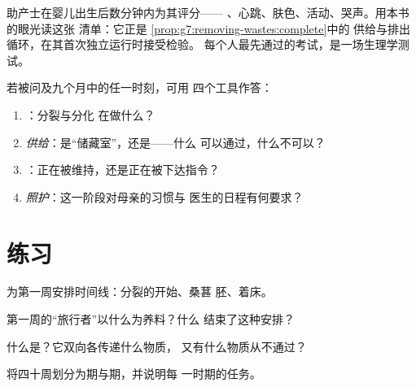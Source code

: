 \begin{example}[新生儿的第一次“体检”]\label{ex:g8:from-egg-to-birth:audit}
助产士在婴儿出生后数分钟内为其评分——
、心跳、肤色、活动、哭声。用本书的眼光读这张
清单：它正是
\cref{prop:g7:removing-wastes:complete}中的
供给与排出循环，在其首次独立运行时接受检验。
每个人最先通过的考试，是一场生理学测试。
\end{example}

\begin{method}[解释妊娠的任一阶段]\label{met:g8:from-egg-to-birth:explain}
若被问及九个月中的任一时刻，可用
四个工具作答：
\begin{enumerate}
  \item \emph{}：分裂与分化
        在做什么？
  \item \emph{供给}：是“储藏室”，还是——什么
        可以通过，什么不可以？
  \item \emph{}：正在被维持，还是正在被下达指令？
  \item \emph{照护}：这一阶段对母亲的习惯与
        医生的日程有何要求？
\end{enumerate}
\end{method}

\section{练习}

\begin{exercise}[$\star$]\label{exo:g8:from-egg-to-birth:1}
为第一周安排时间线：分裂的开始、桑葚
胚、着床。
\end{exercise}

\begin{exercise}[$\star$]\label{exo:g8:from-egg-to-birth:2}
第一周的“旅行者”以什么为养料？什么
结束了这种安排？
\end{exercise}

\begin{exercise}[$\star$]\label{exo:g8:from-egg-to-birth:3}
什么是？它双向各传递什么物质，
又有什么物质从不通过？
\end{exercise}

\begin{exercise}[$\star$]\label{exo:g8:from-egg-to-birth:4}
将四十周划分为期与期，并说明每
一时期的任务。
\end{exercise}

